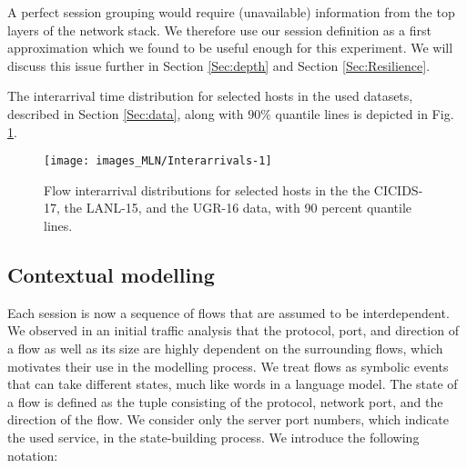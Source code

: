 A perfect session grouping would require (unavailable) information from the top layers of the network stack. We therefore use our session definition as  a first approximation which we found to be useful enough for this experiment. We will discuss this issue further in Section \ref{Sec:depth} and Section \ref{Sec:Resilience}.


The interarrival time distribution for selected hosts in the used datasets, described in Section \ref{Sec:data}, along with $90\%$ quantile lines is depicted in Fig. \ref{fig:Interarrivals}.

\begin{figure}
\centering
\texttt{[image: images\_MLN/Interarrivals-1]}
 \caption[Flow interarrival distributions for selected hosts in the the CICIDS-17, the LANL-15, and the UGR-16 data, with 90 percent quantile lines]{Flow interarrival distributions for selected hosts in the the CICIDS-17, the LANL-15, and the UGR-16 data, with 90 percent quantile lines.}\label{fig:Interarrivals}
\end{figure}

\subsection{Contextual modelling}
Each session is now a sequence of flows that are assumed to be interdependent. %
We observed in an initial traffic analysis that the protocol, port, and direction of a flow as well as its size are highly dependent on the surrounding flows, %
which motivates their use in the modelling process. We treat flows as symbolic events that can take different states, much like words in a language model. The state of a flow is defined as the tuple consisting of the protocol, network port, and the direction of the flow. %
We consider only the server port numbers, which indicate the used service, in the state-building process.
We introduce the following notation:

